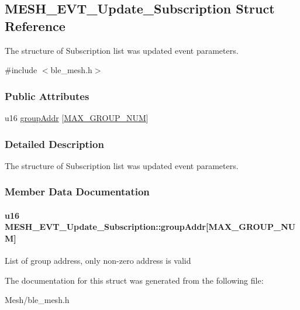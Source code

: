\hypertarget{struct_m_e_s_h___e_v_t___update___subscription}{}\subsection{M\+E\+S\+H\+\_\+\+E\+V\+T\+\_\+\+Update\+\_\+\+Subscription Struct Reference}
\label{struct_m_e_s_h___e_v_t___update___subscription}


The structure of Subscription list was updated event parameters.  




{\ttfamily \#include $<$ble\+\_\+mesh.\+h$>$}

\subsubsection*{Public Attributes}
\begin{DoxyCompactItemize}
\item 
u16 \hyperlink{struct_m_e_s_h___e_v_t___update___subscription_acfed2cbbc3e3716a2f69cc539d6e397a}{group\+Addr} \mbox{[}\hyperlink{group___m_e_s_h___g_r_o_u_p___n_u_m_ga4c4e392ad838b407e834d8fc117f797c}{M\+A\+X\+\_\+\+G\+R\+O\+U\+P\+\_\+\+N\+UM}\mbox{]}
\end{DoxyCompactItemize}


\subsubsection{Detailed Description}
The structure of Subscription list was updated event parameters. 

\subsubsection{Member Data Documentation}
\paragraph[{\texorpdfstring{group\+Addr}{groupAddr}}]{\setlength{\rightskip}{0pt plus 5cm}u16 M\+E\+S\+H\+\_\+\+E\+V\+T\+\_\+\+Update\+\_\+\+Subscription\+::group\+Addr\mbox{[}{\bf M\+A\+X\+\_\+\+G\+R\+O\+U\+P\+\_\+\+N\+UM}\mbox{]}}\hypertarget{struct_m_e_s_h___e_v_t___update___subscription_acfed2cbbc3e3716a2f69cc539d6e397a}{}\label{struct_m_e_s_h___e_v_t___update___subscription_acfed2cbbc3e3716a2f69cc539d6e397a}
List of group address, only non-\/zero address is valid 

The documentation for this struct was generated from the following file\+:\begin{DoxyCompactItemize}
\item 
Mesh/ble\+\_\+mesh.\+h\end{DoxyCompactItemize}
